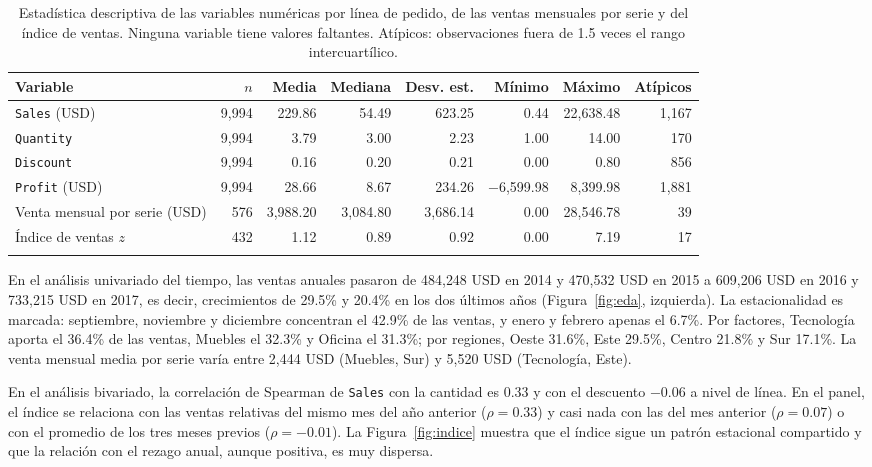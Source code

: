 \documentclass[pdflatex,sn-mathphys-num]{sn-jnl}
\begin{document}
\begin{table}[!htb]
\caption{Estadística descriptiva de las variables numéricas por línea de pedido, de las ventas mensuales por serie y del índice de ventas. Ninguna variable tiene valores faltantes. Atípicos: observaciones fuera de 1.5 veces el rango intercuartílico.}\label{tab:eda}
\footnotesize
\begin{tabular*}{\textwidth}{@{\extracolsep\fill}lrrrrrrr}
\toprule
Variable & $n$ & Media & Mediana & Desv. est. & Mínimo & Máximo & Atípicos \\
\midrule
\texttt{Sales} (USD) & 9{,}994 & 229.86 & 54.49 & 623.25 & 0.44 & 22{,}638.48 & 1{,}167 \\
\texttt{Quantity} & 9{,}994 & 3.79 & 3.00 & 2.23 & 1.00 & 14.00 & 170 \\
\texttt{Discount} & 9{,}994 & 0.16 & 0.20 & 0.21 & 0.00 & 0.80 & 856 \\
\texttt{Profit} (USD) & 9{,}994 & 28.66 & 8.67 & 234.26 & $-$6{,}599.98 & 8{,}399.98 & 1{,}881 \\
Venta mensual por serie (USD) & 576 & 3{,}988.20 & 3{,}084.80 & 3{,}686.14 & 0.00 & 28{,}546.78 & 39 \\
Índice de ventas $z$ & 432 & 1.12 & 0.89 & 0.92 & 0.00 & 7.19 & 17 \\
\botrule
\end{tabular*}
\end{table}

En el análisis univariado del tiempo, las ventas anuales pasaron de 484{,}248 USD en 2014 y 470{,}532 USD en 2015 a 609{,}206 USD en 2016 y 733{,}215 USD en 2017, es decir, crecimientos de 29.5\% y 20.4\% en los dos últimos años (Figura~\ref{fig:eda}, izquierda). La estacionalidad es marcada: septiembre, noviembre y diciembre concentran el 42.9\% de las ventas, y enero y febrero apenas el 6.7\%. Por factores, Tecnología aporta el 36.4\% de las ventas, Muebles el 32.3\% y Oficina el 31.3\%; por regiones, Oeste 31.6\%, Este 29.5\%, Centro 21.8\% y Sur 17.1\%. La venta mensual media por serie varía entre 2{,}444 USD (Muebles, Sur) y 5{,}520 USD (Tecnología, Este).

En el análisis bivariado, la correlación de Spearman de \texttt{Sales} con la cantidad es 0.33 y con el descuento $-0.06$ a nivel de línea. En el panel, el índice se relaciona con las ventas relativas del mismo mes del año anterior ($\rho=0.33$) y casi nada con las del mes anterior ($\rho=0.07$) o con el promedio de los tres meses previos ($\rho=-0.01$). La Figura~\ref{fig:indice} muestra que el índice sigue un patrón estacional compartido y que la relación con el rezago anual, aunque positiva, es muy dispersa.
\end{document}
